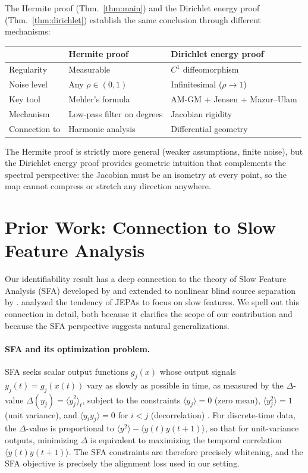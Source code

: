The Hermite proof (Thm.~\ref{thm:main}) and the Dirichlet energy proof (Thm.~\ref{thm:dirichlet}) establish the same conclusion through different mechanisms:

\begin{center}
\renewcommand{\arraystretch}{1.3}
\begin{tabular}{lll}
\hline
& \textbf{Hermite proof} & \textbf{Dirichlet energy proof} \\
\hline
Regularity & Measurable & $C^1$ diffeomorphism \\
Noise level & Any $\rho \in (0,1)$ & Infinitesimal ($\rho \to 1$) \\
Key tool & Mehler's formula & AM-GM + Jensen + Mazur--Ulam \\
Mechanism & Low-pass filter on degrees & Jacobian rigidity \\
Connection to & Harmonic analysis & Differential geometry \\
\hline
\end{tabular}
\end{center}

The Hermite proof is strictly more general (weaker assumptions, finite noise), but the Dirichlet energy proof provides geometric intuition that complements the spectral perspective: the Jacobian must be an isometry at every point, so the map cannot compress or stretch any direction anywhere.



\section{Prior Work: Connection to Slow Feature Analysis}
\label{app:prior-work}

Our identifiability result has a deep connection to the theory of Slow Feature Analysis (SFA) developed by \citet{wiskott2002} and extended to nonlinear blind source separation by \citet{sprekeler2014}. \citet{sobal2022slow} analyzed the tendency of JEPAs to focus on slow features. We spell out this connection in detail, both because it clarifies the scope of our contribution and because the SFA perspective suggests natural generalizations.

\paragraph{SFA and its optimization problem.}
SFA seeks scalar output functions $g_j(x)$ whose output signals $y_j(t) = g_j(x(t))$ vary as slowly as possible in time, as measured by the $\Delta$-value $\Delta(y_j) = \langle \dot{y}_j^2 \rangle_t$, subject to the constraints $\langle y_j \rangle = 0$ (zero mean), $\langle y_j^2 \rangle = 1$ (unit variance), and $\langle y_i y_j \rangle = 0$ for $i < j$ (decorrelation) \citep{wiskott2002}.
For discrete-time data, the $\Delta$-value is proportional to $\langle y^2 \rangle - \langle y(t) y(t+1) \rangle$, so that for unit-variance outputs, minimizing $\Delta$ is equivalent to maximizing the temporal correlation $\langle y(t) y(t+1) \rangle$.
The SFA constraints are therefore precisely whitening, and the SFA objective is precisely the alignment loss used in our setting.

